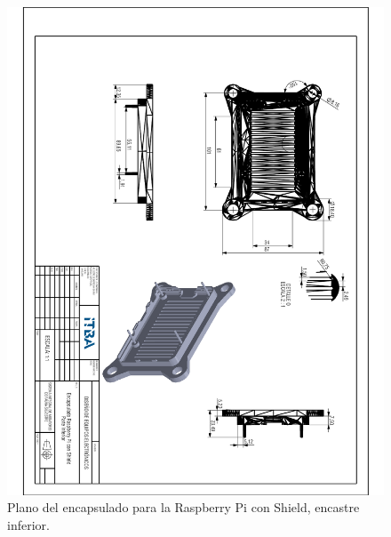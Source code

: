 \begin{figure}[H]
	\centering
	\includegraphics[width=\linewidth]{ImagenesApendice/RpiCasingBottom}
	\caption{Plano del encapsulado para la Raspberry Pi con Shield, encastre inferior.}
	\label{fig:RpiCasingBottom}
\end{figure}

